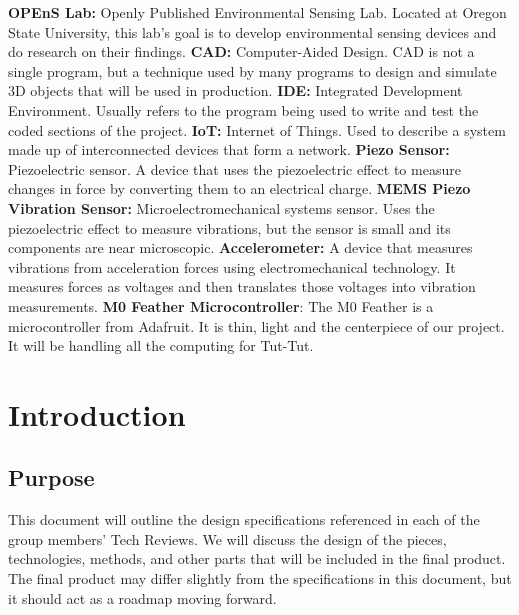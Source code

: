 \documentclass[letterpaper,10pt,draftclsnofoot,onecolumn]{article}
\begin{document}
\quad \newline
\textbf{OPEnS Lab:} Openly Published Environmental Sensing Lab. Located at Oregon State University, this lab's goal is to develop environmental sensing devices and do research on their findings.
\newline
\newline
\textbf{CAD:} Computer-Aided Design. CAD is not a single program, but a technique used by many programs to design and simulate 3D objects that will be used in production.
\newline
\newline
\textbf{IDE:} Integrated Development Environment. Usually refers to the program being used to write and test the coded sections of the project.
\newline
\newline
\textbf{IoT:} Internet of Things. Used to describe a system made up of interconnected devices that form a network.
\newline
\newline
\textbf{Piezo Sensor:} Piezoelectric sensor. A device that uses the piezoelectric effect to measure changes in force by converting them to an electrical charge.
\newline
\newline
\textbf{MEMS Piezo Vibration Sensor:} Microelectromechanical systems sensor. Uses the piezoelectric effect to measure vibrations, but the sensor is small and its components are near microscopic.
\newline
\newline
\textbf{Accelerometer:} A device that measures vibrations from acceleration forces using electromechanical technology. It measures forces as voltages and then translates those voltages into vibration measurements.
\newline
\newline
\textbf{M0 Feather Microcontroller}: The M0 Feather is a microcontroller from Adafruit. It is thin, light and the centerpiece of our project. It will be handling all the computing for Tut-Tut.

\pagebreak

\tableofcontents
\pagebreak

\section{Introduction}
\subsection{Purpose}
This document will outline the design specifications referenced in each of the group members' Tech Reviews. We will discuss the design of the pieces, technologies, methods, and other parts that will be included in the final product. The final product may differ slightly from the specifications in this document, but it should act as a roadmap moving forward.
\end{document}
